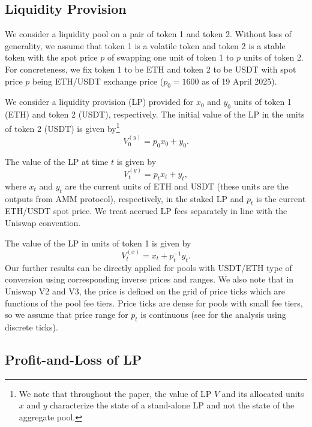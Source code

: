 \documentclass[pdftex,11pt,a4paper] {article}
\begin{document}
\label{sec:lp}

\subsection{Liquidity Provision}

We consider a liquidity pool on a pair of token 1 and token 2. Without loss
of generality, we assume that token 1 is a volatile token and token 2 is a
stable token with the spot price $p$ of swapping one unit of token 1 to $p$
units of token 2. For concreteness, we fix token 1 to be ETH and token 2 to
be USDT with spot price $p$ being ETH/USDT exchange price ($p_{0}=1600$ as
of 19 April 2025).

We consider a liquidity provision (LP) provided for $x_{0}$ and $y_{0}$ units
of token 1 (ETH) and token 2 (USDT), respectively. The initial value of the
LP in the units of token 2 (USDT) is given by\footnote{We note that throughout the paper, the value of LP $V$ and its allocated units $x$ and $y$ characterize the state of a stand-alone LP and not the state of the aggregate pool.}
\begin{equation}  \label{eq:pnl1}
V^{(y)}_{0} = p_{0} x_{0} + y_{0}.
\end{equation}

The value of the LP at time $t$ is given by
\begin{equation}  \label{eq:pnl2}
V^{(y)}_{t} = p_{t} x_{t} + y_{t},
\end{equation}
where $x_{t}$ and $y_{t}$ are the current units of ETH and USDT (these units
are the outputs from AMM protocol), respectively, in the staked LP and $%
p_{t} $ is the current ETH/USDT spot price. We treat accrued LP fees
separately in line with the Uniswap convention.

The value of the LP in units of token 1 is given by
\begin{equation}  \label{eq:pnl1_}
V^{(x)}_{t} = x_{t} + p^{-1}_{t} y_{t}.
\end{equation}
Our further results can be directly applied for pools with USDT/ETH type of
conversion using corresponding inverse prices and ranges. We also note that
in Uniswap V2 and V3, the price is defined on the grid of price ticks which
are functions of the pool fee tiers. Price ticks are dense for pools with
small fee tiers, so we assume that price range for $p_{t}$ is continuous
(see \cite{Echenim2023} for the analysis using discrete ticks).

\subsection{Profit-and-Loss of LP}
\end{document}
